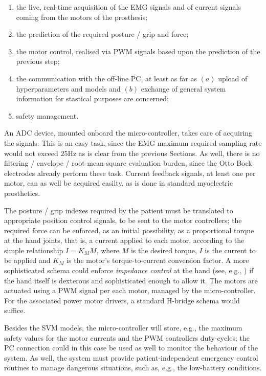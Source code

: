 \begin{enumerate}

  \item the live, real-time acquisition of the EMG signals and of
    current signals coming from the motors of the prosthesis;

  \item the prediction of the required posture / grip and force;

  \item the motor control, realised via PWM signals based upon the
    prediction of the previous step;

  \item the communication with the off-line PC, at least as far as
    $(a)$ upload of hyperparameters and models and $(b)$ exchange of
    general system information for stastical purposes are concerned;

  \item safety management.

\end{enumerate}

An ADC device, mounted onboard the micro-controller, takes care of
acquiring the signals. This is an easy task, since the EMG maximum
required sampling rate would not exceed $25$Hz as is clear from the
previous Sections. As well, there is no filtering / envelope /
root-mean-square evaluation burden, since the Otto Bock electrodes
already perform these task. Current feedback signals, at least one per
motor, can as well be acquired easilty, as is done in standard
myoelectric prosthetics.

The posture / grip indexes required by the patient must be translated
to appropriate position control signals, to be sent to the motor
controllers; the required force can be enforced, as an initial
possibility, as a proportional torque at the hand joints, that is, a
current applied to each motor, according to the simple relationship $I
= K_M M$, where $M$ is the desired torque, $I$ is the current to be
applied and $K_M$ is the motor's torque-to-current conversion
factor. A more sophisticated schema could enforce \emph{impedance
control} at the hand (see, e.g., \cite{alin}) if the hand itself is
dexterous and sophisticated enough to allow it. The motors are
actuated using a PWM signal per each motor, managed by the
micro-controller. For the associated power motor drivers, a standard
H-bridge schema would suffice.

Besides the SVM models, the micro-controller will store, e.g., the
maximum safety values for the motor currents and the PWM controllers
duty-cycles; the PC connection could in this case be used as well to
monitor the behaviour of the system. As well, the system must provide
patient-independent emergency control routines to manage dangerous
situations, such as, e.g., the low-battery conditions.
